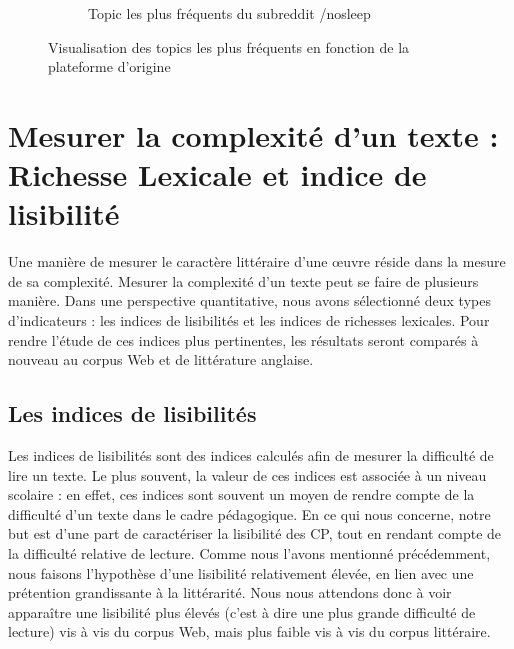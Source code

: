 \documentclass[12pt,a4paper,oneside,titlepage]{book} %
\begin{document}
\begin{figure}[htbp]
\begin{subfigure}[b]{0.45\textwidth}
				\caption{Topic les plus fréquents du subreddit /nosleep}
				\label{fig:topic_reddit}
			\end{subfigure}
			\caption{Visualisation des topics les plus fréquents en fonction de la plateforme d'origine}
			\label{fig:topics_plateforme}
		\end{figure}
		

	\section{Mesurer la complexité d'un texte : Richesse Lexicale et indice de lisibilité}
	
	Une manière de mesurer le caractère littéraire d'une œuvre réside dans la mesure de sa complexité. Mesurer la complexité d'un texte peut se faire de plusieurs manière. Dans une perspective quantitative, nous avons sélectionné deux types d'indicateurs : les indices de lisibilités et les indices de richesses lexicales. 
	Pour rendre l'étude de ces indices plus pertinentes, les résultats seront comparés à nouveau au corpus Web et de littérature anglaise.


	\subsection{Les indices de lisibilités} 
	Les indices de lisibilités sont des indices calculés afin de mesurer la difficulté de lire un texte. Le plus souvent, la valeur de ces indices est associée à un niveau scolaire : en effet, ces indices sont souvent un moyen de rendre compte de la difficulté d'un texte dans le cadre pédagogique.
	En ce qui nous concerne, notre but est d'une part de caractériser la lisibilité des CP, tout en rendant compte de la difficulté relative de lecture. Comme nous l'avons mentionné précédemment, nous faisons l'hypothèse d'une lisibilité relativement élevée, en lien avec une prétention grandissante à la littérarité. Nous nous attendons donc à voir apparaître une lisibilité plus élevés (c'est à dire une plus grande difficulté de lecture) vis à vis du corpus Web, mais plus faible vis à vis du corpus littéraire.
	
\end{document}
